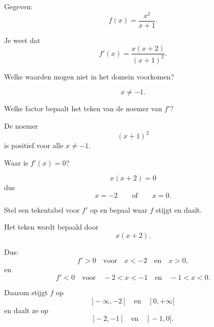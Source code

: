 \documentclass{ximera}
\begin{document}

\begin{oefening}{\oefU\ESS}

Gegeven:
\[
f(x)=\frac{x^2}{x+1}.
\]

Je weet dat
\[
f'(x)=\frac{x(x+2)}{(x+1)^2}.
\]

\begin{question}
Welke waarden mogen niet in het domein voorkomen?

\begin{oplossing}
\[
x\neq-1.
\]
\end{oplossing}
\end{question}


\begin{question}
Welke factor bepaalt het teken van de noemer van $f'$?

\begin{oplossing}
De noemer
\[
(x+1)^2
\]
is positief voor alle $x\neq-1$.
\end{oplossing}
\end{question}


\begin{question}
Waar is $f'(x)=0$?

\begin{oplossing}
\[
x(x+2)=0
\]
dus
\[
x=-2
\qquad\text{of}\qquad
x=0.
\]
\end{oplossing}
\end{question}


\begin{question}
Stel een tekentabel voor $f'$ op en bepaal waar $f$ stijgt
en daalt.

\begin{oplossing}
Het teken wordt bepaald door
\[
x(x+2).
\]

Dus:
\[
f'>0
\quad\text{voor}\quad
x<-2
\quad\text{en}\quad
x>0,
\]
en
\[
f'<0
\quad\text{voor}\quad
-2<x<-1
\quad\text{en}\quad
-1<x<0.
\]

Daarom stijgt $f$ op
\[
]-\infty,-2[
\quad\text{en}\quad
]0,+\infty[
\]
en daalt ze op
\[
]-2,-1[
\quad\text{en}\quad
]-1,0[.
\]
\end{oplossing}
\end{question}

\end{oefening}


\end{document}
